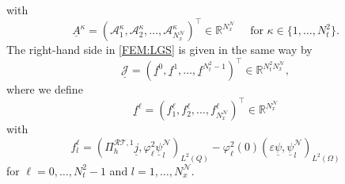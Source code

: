 \documentclass[a4paper,11pt]{article}
\newcommand{\R}{\mathbb R}
\renewcommand{\vec}[1]{\underline{#1}}
\begin{document}
with
\begin{equation*}
	\vec{A}^\kappa = (\mathcal A_1^\kappa, \mathcal A_2^\kappa, \dots, \mathcal A_{N_x^\mathcal{N}}^\kappa)^\top \in \R^{N_x^\mathcal{N}} \quad \text{ for } \kappa \in \{1,\dots, N_t^2\}.
\end{equation*}
The right-hand side in \eqref{FEM:LGS} is given in the same way by
\begin{equation*}
	\vec{\mathcal J} = ( \vec f^0, \vec f^1, \dots, \vec f^{N_t^2-1} )^\top \in \R^{N_t^2 N_x^\mathcal{N}}, 
\end{equation*}
where we define
\begin{equation*}
	\vec f^\ell = (f_1^\ell, f_2^\ell, \dots, f_{N_x^\mathcal{N}}^\ell)^\top \in \R^{N_x^\mathcal{N}} 
\end{equation*}
with
\begin{equation} \label{FEM:Ohne:RSf}
	f_l^\ell = (\Pi_h^{\mathcal{RT},1} \vec j,\varphi^2_\ell \vec \psi^\mathcal{N}_l )_{L^2(Q)} -\varphi^2_\ell(0)  \left(\varepsilon\vec \psi, \vec \psi^\mathcal{N}_l\right)_{L^2(\Omega)} 
\end{equation}
for  $\ell=0,\dots, N_t^2-1$ and   $l=1,\dots,N_x^\mathcal{N}.$
\end{document}
